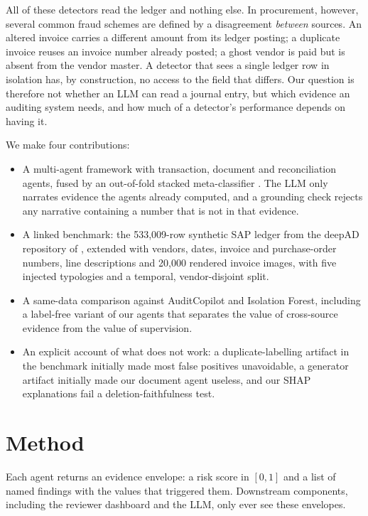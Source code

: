 \documentclass{article}
\begin{document}
All of these detectors read the ledger and nothing else. In procurement, however, several common fraud schemes are defined by a disagreement \emph{between} sources. An altered invoice carries a different amount from its ledger posting; a duplicate invoice reuses an invoice number already posted; a ghost vendor is paid but is absent from the vendor master. A detector that sees a single ledger row in isolation has, by construction, no access to the field that differs. Our question is therefore not whether an LLM can read a journal entry, but which evidence an auditing system needs, and how much of a detector's performance depends on having it.

We make four contributions:
\begin{itemize}
  \item A multi-agent framework with transaction, document and reconciliation agents, fused by an out-of-fold stacked meta-classifier \citep{wolpert1992stacked}. The LLM only narrates evidence the agents already computed, and a grounding check rejects any narrative containing a number that is not in that evidence.
  \item A linked benchmark: the 533,009-row synthetic SAP ledger from the deepAD repository of \citet{schreyer2017detection}, extended with vendors, dates, invoice and purchase-order numbers, line descriptions and 20,000 rendered invoice images, with five injected typologies and a temporal, vendor-disjoint split.
  \item A same-data comparison against AuditCopilot and Isolation Forest, including a label-free variant of our agents that separates the value of cross-source evidence from the value of supervision.
  \item An explicit account of what does not work: a duplicate-labelling artifact in the benchmark initially made most false positives unavoidable, a generator artifact initially made our document agent useless, and our SHAP explanations fail a deletion-faithfulness test.
\end{itemize}

\section{Method}

Each agent returns an evidence envelope: a risk score in $[0,1]$ and a list of named findings with the values that triggered them. Downstream components, including the reviewer dashboard and the LLM, only ever see these envelopes.
\end{document}
